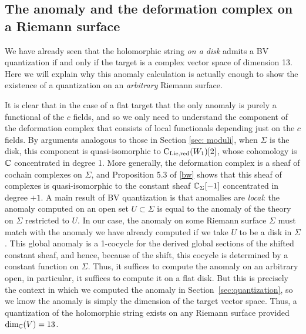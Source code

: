 
\subsection{The anomaly and the deformation complex on a Riemann surface}

We have already seen that the holomorphic string {\it on a disk} admits a BV quantization if and only if the target is a complex vector space of dimension 13.
Here we will explain why this anomaly calculation is actually enough to show the existence of a quantization on an {\it arbitrary} Riemann surface. 

It is clear that  in the case of a flat target that the only anomaly is purely a functional of the $c$ fields,
and so we only need to understand the component of the deformation complex that consists of local functionals depending just on the $c$ fields.
By arguments analogous to those in Section \ref{sec: moduli}, 
when $\Sigma$ is the disk,
this component is quasi-isomorphic to ${\rm C}_{\rm Lie,red}(W_1)[2]$,
whose cohomology is $\mathbb C$ concentrated in degree 1.
More generally, the deformation complex is a sheaf of cochain complexes on $\Sigma$, 
and Proposition 5.3 of \ref{bw} shows that this sheaf of complexes is quasi-isomorphic to the constant sheaf $\mathbb C_\Sigma[-1]$ concentrated in degree $+1$. 
A main result of BV quantization \cite{CosBook}  is that anomalies are {\em local}: the anomaly computed on an open set $U \subset \Sigma$ is equal to the anomaly of the theory on $\Sigma$ restricted to $U$. 
In our case, the anomaly on some Riemann surface $\Sigma$ must match with the anomaly we have already computed if we take $U$ to be a disk in $\Sigma$.
This global anomaly is a 1-cocycle for the derived global sections of the shifted constant sheaf, 
and hence, because of the shift, this cocycle is determined by a constant function on $\Sigma$.
Thus, it suffices to compute the anomaly on an arbitrary open, 
in particular, it suffices to compute it on a flat disk. 
But this is precisely the context in which we computed the anomaly in Section~\ref{sec:quantization}, 
so we know the anomaly is simply the dimension of the target vector space.
Thus, a quantization of the holomorphic string exists on any Riemann surface provided $\dim_{\mathbb C}(V) = 13$. 

